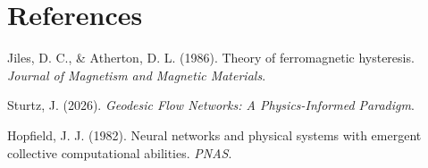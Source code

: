 \documentclass[12pt,a4paper]{article}
\begin{document}
\section*{References}

\begin{enumerate}[leftmargin=1.5cm, label={[\arabic*]}]
\item Jiles, D. C., \& Atherton, D. L. (1986). Theory of ferromagnetic hysteresis. \textit{Journal of Magnetism and Magnetic Materials}.

\item Sturtz, J. (2026). \textit{Geodesic Flow Networks: A Physics-Informed Paradigm}.

\item Hopfield, J. J. (1982). Neural networks and physical systems with emergent collective computational abilities. \textit{PNAS}.
\end{enumerate}
\end{document}
